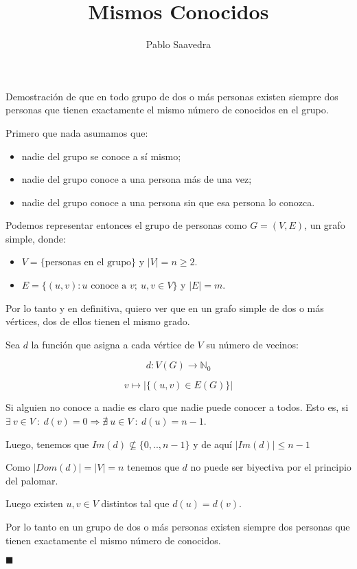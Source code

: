 \documentclass{article}
\begin{document}
\author{Pablo Saavedra}
\title{Mismos Conocidos}
\maketitle
{}

\noindent
Demostración de que en todo grupo de dos o más personas existen siempre dos
personas que tienen exactamente el mismo número de conocidos en el grupo.

\bigskip

\noindent
Primero que nada asumamos que:
\begin{itemize}
	\item nadie del grupo se conoce a sí mismo;
	\item nadie del grupo conoce a una persona más de una vez;
	\item nadie del grupo conoce a una persona sin que esa persona lo conozca.
\end{itemize}

\noindent
Podemos representar entonces el grupo de personas como $G = (V, E)$, un grafo simple, donde:
\begin{itemize}
	\item $V = \{\text{personas en el grupo}\}$ y $|V| = n \geq 2$.
	\item $E = \{(u, v) : u \text{ conoce a } v ;\ u,v \in V\}$ y $|E| = m$.
\end{itemize}

\noindent
Por lo tanto y en definitiva, quiero ver que en un grafo simple de dos o más vértices, dos de ellos tienen el mismo grado.

\bigskip

\noindent
Sea $d$ la función que asigna a cada vértice de $V$ su número de vecinos:

\bigskip

$$d: V(G) \rightarrow \mathbb{N}_{0}$$

$$v \mapsto |\{ (u, v) \in E(G) \}|$$

\bigskip

\noindent
Si alguien no conoce a nadie es claro que nadie puede conocer a todos.
\noindent
Esto es, si $\exists\ v \in V\ :\ d(v) = 0 \Rightarrow \nexists\ u \in V\ :\ d(u) = n - 1$.

\bigskip

\noindent
Luego, tenemos que $Im(d) \not \subseteq \{0, .., n - 1\}$ y de aquí $|Im(d)| \leq n - 1$

\bigskip

\noindent
Como $|Dom(d)| = |V| = n$ tenemos que $d$ no puede ser biyectiva por el principio del palomar.

\bigskip

\noindent
Luego existen $u, v \in V$ distintos tal que $d(u) = d(v)$.

\bigskip

\noindent
Por lo tanto en un grupo de dos o más personas existen siempre dos personas que tienen exactamente el mismo número de conocidos.

\hspace{9cm}$\blacksquare$
\end{document}
